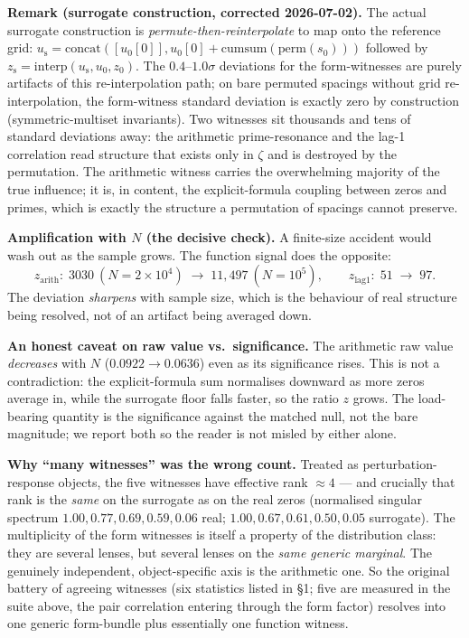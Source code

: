 \documentclass[11pt]{article}
\begin{document}
\medskip\noindent\textbf{Remark (surrogate construction, corrected 2026-07-02).}
The actual surrogate construction is \emph{permute-then-reinterpolate} to map onto the reference grid: $u_{\mathrm{s}} = \mathrm{concat}([u_0[0]], u_0[0] + \mathrm{cumsum}(\mathrm{perm}(s_0)))$ followed by $z_{\mathrm{s}} = \mathrm{interp}(u_{\mathrm{s}}, u_0, z_0)$. The $0.4$--$1.0\sigma$ deviations for the form-witnesses are purely artifacts of this re-interpolation path; on bare permuted spacings without grid re-interpolation, the form-witness standard deviation is exactly zero by construction (symmetric-multiset invariants).
Two witnesses sit thousands and tens of standard deviations away: the arithmetic prime-resonance and the lag-1 correlation read structure that exists only in $\zeta$ and is destroyed by the permutation. The arithmetic witness carries the overwhelming majority of the true influence; it is, in content, the explicit-formula coupling between zeros and primes, which is exactly the structure a permutation of spacings cannot preserve.

\textbf{Amplification with $N$ (the decisive check).} A finite-size accident would wash out as the sample grows. The function signal does the opposite:
\[
z_{\mathrm{arith}}:\;3030\ (N{=}2{\times}10^4)\;\to\;11{,}497\ (N{=}10^5),
\qquad
z_{\mathrm{lag1}}:\;51\;\to\;97.
\]
The deviation \emph{sharpens} with sample size, which is the behaviour of real structure being resolved, not of an artifact being averaged down.

\textbf{An honest caveat on raw value vs.\ significance.} The arithmetic raw value \emph{decreases} with $N$ ($0.0922\to0.0636$) even as its significance rises. This is not a contradiction: the explicit-formula sum normalises downward as more zeros average in, while the surrogate floor falls faster, so the ratio $z$ grows. The load-bearing quantity is the significance against the matched null, not the bare magnitude; we report both so the reader is not misled by either alone.

\textbf{Why ``many witnesses'' was the wrong count.} Treated as perturbation-response objects, the five witnesses have effective rank $\approx4$ --- and crucially that rank is the \emph{same} on the surrogate as on the real zeros (normalised singular spectrum $1.00,0.77,0.69,0.59,0.06$ real; $1.00,0.67,0.61,0.50,0.05$ surrogate). The multiplicity of the form witnesses is itself a property of the distribution class: they are several lenses, but several lenses on the \emph{same generic marginal}. The genuinely independent, object-specific axis is the arithmetic one. So the original battery of agreeing witnesses (six statistics listed in \S1; five are measured in the suite above, the pair correlation entering through the form factor) resolves into one generic form-bundle plus essentially one function witness.
\end{document}
